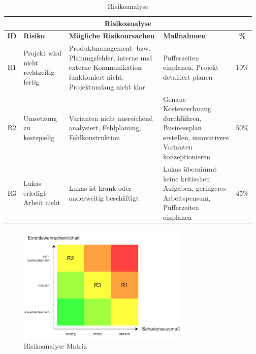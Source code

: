 \begin{table}[H]
  \centering
  \small
  \begin{tabular}{c|p{}|p{}|p{}|c}
    \multicolumn{5}{c}{\textbf{Risikoanalyse}}                                                                                                                                                                                                                                                     \\
    \toprule
    \textbf{ID} & \textbf{Risiko}                       & \textbf{Mögliche Risikoursachen}                                                                                       & \textbf{Maßnahmen}                                                                                & \textbf{\%} \\
    \midrule
    R1          & Projekt wird nicht rechtzeitig fertig & Produktmanagement- bzw. Planungsfehler, interne und externe Kommunikation funktioniert nicht, Projektumfang nicht klar & Pufferzeiten einplanen, Projekt detailiert planen                                                 & 10\%        \\ \ghline
    R2          & Umsetzung zu kostspielig              & Varianten nicht ausreichend analysiert, Fehlplanung, Fehlkonstruktion                                                  & Genaue Kostenrechnung durchführen, Businessplan erstellen, innovativere Varianten konzeptionieren & 50\%        \\ \ghline
    R3          & Lukas erledigt Arbeit nicht           & Lukas ist krank oder anderweitig beschäftigt                                                                           & Lukas übernimmt keine kritischen Aufgaben, geringeres Arbeitspensum, Pufferzeiten einplanen       & 45\%        \\
    \bottomrule
  \end{tabular}
  \caption{Risikoanalyse}
  \label{tab:risikoanalyse}
\end{table}

\begin{figure}[H]
  \centering
  \includegraphics[width=0.75\textwidth]{images/risikoanalyse.png}
  \caption{Risikoanalyse Matrix}
  \label{fig:risikoanalyse_matrix}
\end{figure}